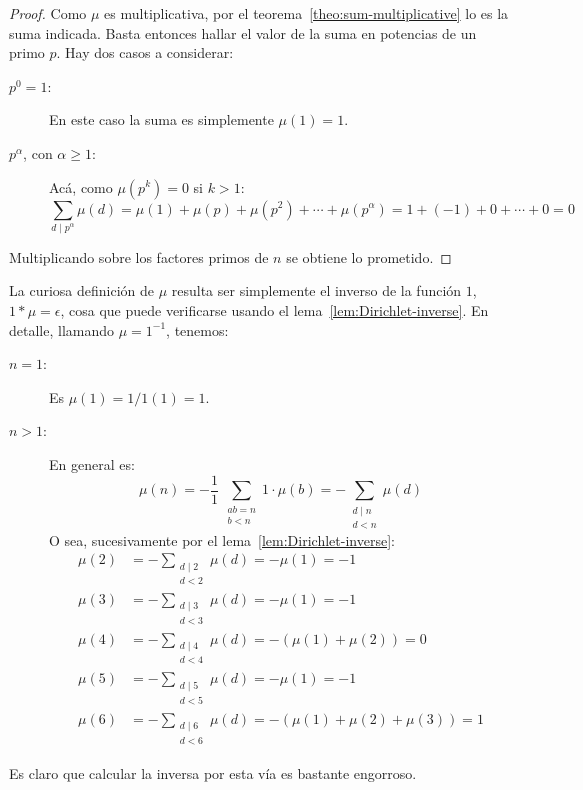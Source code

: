   \begin{proof}
    Como \(\mu\) es multiplicativa,
    por el teorema~\ref{theo:sum-multiplicative}
    lo es la suma indicada.
    Basta entonces hallar el valor de la suma
    en potencias de un primo \(p\).
    Hay dos casos a considerar:
    \begin{description}
    \item[\boldmath \(p^0 = 1\):\unboldmath]
      En este caso la suma es simplemente \(\mu(1) = 1\).
    \item[\boldmath \(p^\alpha\), con \(\alpha \ge 1\):\unboldmath]
      Acá,
      como \(\mu(p^k) = 0\) si \(k > 1\):
      \begin{equation*}
	\sum_{d \mid p^\alpha} \mu(d)
	  = \mu(1) + \mu(p) + \mu(p^2) + \dotsb + \mu(p^\alpha)
	  = 1 + (-1) + 0 + \dotsb + 0
	  = 0
      \end{equation*}
    \end{description}
    Multiplicando sobre los factores primos de \(n\)
    se obtiene lo prometido.
  \end{proof}
  La curiosa definición de \(\mu\)
  resulta ser simplemente el inverso de la función \(1\),
  \(1 * \mu = \epsilon\),
  cosa que puede verificarse
  usando el lema~\ref{lem:Dirichlet-inverse}.
  En detalle,
  llamando \(\mu = 1^{-1}\),
  tenemos:
  \begin{description}
  \item[\boldmath \(n = 1\):\unboldmath]
    Es \(\mu(1) = 1 / 1(1) = 1\).
  \item[\boldmath \(n > 1\):\unboldmath]
    En general es:
    \begin{equation*}
      \mu(n)
	= - \frac{1}{1} \,
	      \sum_{\substack{a b = n \\ b < n}}
		1 \cdot \mu(b)
	= - \sum_{\substack{d \mid n \\ d < n}} \mu(d)
    \end{equation*}
    O sea,
    sucesivamente por el lema~\ref{lem:Dirichlet-inverse}:
    \begin{align*}
      \mu(2)
	&= - \sum_{\substack{d \mid 2 \\ d < 2}} \mu(d)
	 = - \mu(1)
	 = -1 \\
      \mu(3)
	&= - \sum_{\substack{d \mid 3 \\ d < 3}} \mu(d)
	 = - \mu(1)
	 = -1 \\
      \mu(4)
	&= - \sum_{\substack{d \mid 4 \\ d < 4}} \mu(d)
	 = - (\mu(1) + \mu(2))
	 = 0 \\
      \mu(5)
	&= - \sum_{\substack{d \mid 5 \\ d < 5}} \mu(d)
	 = - \mu(1)
	 = -1 \\
      \mu(6)
	&= - \sum_{\substack{d \mid 6 \\ d < 6}} \mu(d)
	 = - (\mu(1) + \mu(2) + \mu(3))
	 = 1
    \end{align*}
  \end{description}
  Es claro que calcular la inversa
  por esta vía es bastante engorroso.


